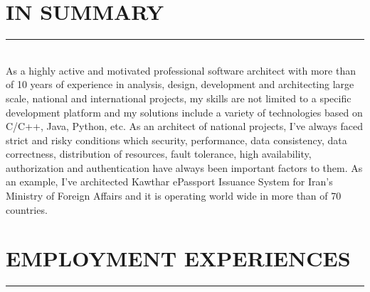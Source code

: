 \documentclass[10pt,a4paper]{article}
\begin{document}
\thispagestyle{fancy}

\section{IN SUMMARY}
\noindent \rule {3.5cm}{0.4pt} \\
As a highly active and motivated professional software architect with more than of 10 years of experience in analysis, design, development and architecting large scale, national and international projects, my skills are not limited to a specific development platform and my solutions include a variety of technologies based on C/C++, Java, Python, etc. As an architect of national projects, I've always faced strict and risky conditions which security, performance, data consistency, data correctness, distribution of resources, fault tolerance, high availability, authorization and authentication have always been important factors to them. As an example, I've architected Kawthar ePassport Issuance System for Iran's Ministry of Foreign Affairs and it is operating world wide in more than of 70 countries.

\section{EMPLOYMENT EXPERIENCES}
\noindent \rule {7.3cm}{0.4pt}
\end{document}
